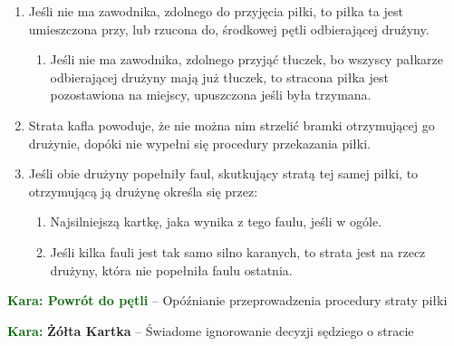 \documentclass[11pt,a4paper]{article}
\newcommand\yellowcard[1]{\bgroup\textcolor{darkgreen}{\textbf{Kara: }}\bgroup\textcolor{darkyellow}{\textbf{Żółta Kartka}} -- #1}
\newcommand\penaltyd[2]{\bgroup\textcolor{darkgreen}{\textbf{Kara: #1}} -- #2}
\begin{document}
\begin{enumerate}
\begin{enumerate}
\begin{enumerate}
    \end{enumerate}
  \end{enumerate}
  \item Jeśli nie ma zawodnika, zdolnego do przyjęcia piłki, to piłka ta jest umieszczona przy, lub rzucona do, środkowej pętli odbierającej drużyny.
  \begin{enumerate}
    \item Jeśli nie ma zawodnika, zdolnego przyjąć tłuczek, bo wszyscy pałkarze odbierającej drużyny mają już tłuczek, to stracona piłka jest pozostawiona na miejscy, upuszczona jeśli była trzymana.
  \end{enumerate}
  \item Strata kafla powoduje, że nie można nim strzelić bramki otrzymującej go drużynie, dopóki nie wypełni się procedury przekazania piłki.
  \item Jeśli obie drużyny popełniły faul, skutkujący stratą tej samej piłki, to otrzymującą ją drużynę określa się przez:
  \begin{enumerate}
    \item Najsilniejszą kartkę, jaka wynika z tego faulu, jeśli w ogóle.
    \item Jeśli kilka fauli jest tak samo silno karanych, to strata jest na rzecz drużyny, która nie popełniła faulu ostatnia.
  \end{enumerate}
\end{enumerate}

\penaltyd{Powrót do pętli}{Opóźnianie przeprowadzenia procedury straty piłki}

\yellowcard{Świadome ignorowanie decyzji sędziego o stracie}
\end{document}
